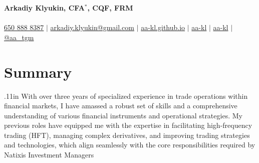 \documentclass[letterpaper,hidelinks]{article}
\begin{document}
\begin{center}
  \textbf{\Huge{Arkadiy Klyukin, CFA$\mathbb{}^\ast$, CQF, FRM}\\} \\ \vspace{1pt}
  \small
  \faMobile* \hspace{.5pt} \href{tel:+16508888387}{650 888 8387}
  $|$
  \faAt \hspace{.5pt} \href{mailto:arkadiy.klyukin@gmail.com}{arkadiy.klyukin@gmail.com}
  $|$
  \faGlobeAmericas \hspace{.5pt} \href{https://aa-kl.github.io}{aa-kl.github.io}
  $|$
  \faGithub \hspace{.5pt} \href{https://github.com/aa-kl}{aa-kl}
  $|$
  \faLinkedinIn \hspace{.5pt} \href{https://www.linkedin.com/in/aa-kl}{aa-kl}
  $|$
  \faTelegramPlane \hspace{.5pt} \href{https://t.me/aa_tgm}{@aa\_tgm}
\end{center}
\vspace{-27pt}
\section{Summary}
{\hspace{0.1in}
\raggedright{\leftskip.11in
With over three years of specialized experience in trade operations within financial markets, I have amassed a robust set of skills and a comprehensive understanding of various financial instruments and operational strategies. My previous roles have equipped me with the expertise in facilitating high-frequency trading (HFT), managing complex derivatives, and improving trading strategies and technologies, which align seamlessly with the core responsibilities required by Natixis Investment Managers
    \\}
}
\vspace{-8pt}
\end{document}
